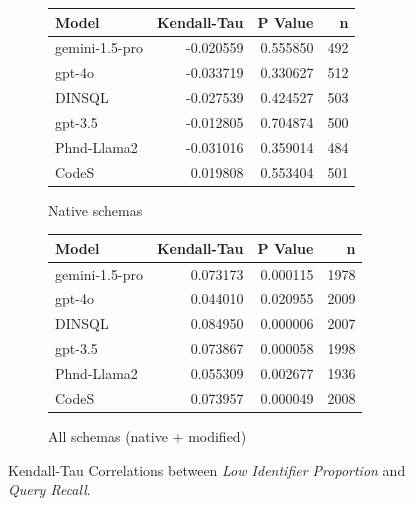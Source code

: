 \begin{figure}
  \centering
  \begin{subfigure}{.5\linewidth}
      \centering
      \begin{tabular}{lrrr}
\toprule
Model & Kendall-Tau & P Value & n \\
\midrule
gemini-1.5-pro & -0.020559 & 0.555850 & 492 \\
gpt-4o & -0.033719 & 0.330627 & 512 \\
DINSQL & -0.027539 & 0.424527 & 503 \\
gpt-3.5 & -0.012805 & 0.704874 & 500 \\
Phnd-Llama2 & -0.031016 & 0.359014 & 484 \\
CodeS & 0.019808 & 0.553404 & 501 \\
\bottomrule
\end{tabular}

      \caption{Native schemas}
      \label{table:natmedium-recall-ktau-native}
  \end{subfigure}%
  \begin{subfigure}{.5\linewidth}
      \centering
      \begin{tabular}{lrrr}
\toprule
Model & Kendall-Tau & P Value & n \\
\midrule
gemini-1.5-pro & 0.073173 & 0.000115 & 1978 \\
gpt-4o & 0.044010 & 0.020955 & 2009 \\
DINSQL & 0.084950 & 0.000006 & 2007 \\
gpt-3.5 & 0.073867 & 0.000058 & 1998 \\
Phnd-Llama2 & 0.055309 & 0.002677 & 1936 \\
CodeS & 0.073957 & 0.000049 & 2008 \\
\bottomrule
\end{tabular}

      \caption{All schemas (native + modified)}
      \label{table:natmedium-recall-ktau-all}
  \end{subfigure}
  \caption{Kendall-Tau Correlations between \emph{Low Identifier Proportion} and \emph{Query Recall}.}
\end{figure}

